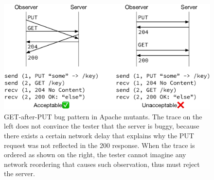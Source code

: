 \begin{figure}
  \includegraphics[width=\linewidth]{figures/http-put-bug}
  \caption[GET-after-PUT bug pattern in Apache mutants.]{GET-after-PUT bug
    pattern in Apache mutants.  The trace on the left does not convince the
    tester that the server is buggy, because there exists a certain network
    delay that explains why the PUT request was not reflected in the 200
    response.  When the trace is ordered as shown on the right, the tester
    cannot imagine any network reordering that causes such observation, thus
    must reject the server.}
  \label{fig:put-bug}
\end{figure}
  
